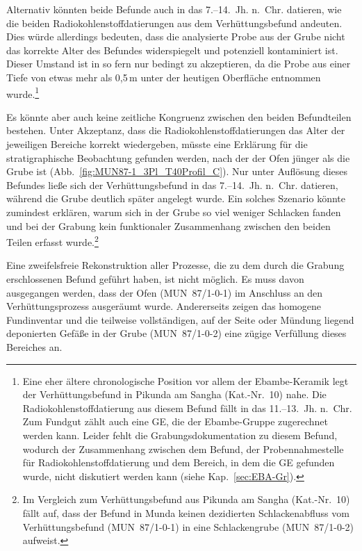 Alternativ könnten beide Befunde auch in das 7.--14.~Jh. n.~Chr. datieren, wie die beiden Radiokohlenstoffdatierungen aus dem Verhüttungsbefund andeuten. Dies würde allerdings bedeuten, dass die analysierte Probe aus der Grube nicht das korrekte Alter des Befundes widerspiegelt und potenziell kontaminiert ist. Dieser Umstand ist in so fern nur bedingt zu akzeptieren, da die Probe aus einer Tiefe von etwas mehr als 0,5\,m unter der heutigen Oberfläche entnommen wurde.\footnote{Eine eher ältere chronologische Position vor allem der Ebambe-Keramik legt der Verhüttungsbefund in Pikunda am \mbox{Sangha} (Kat.-Nr.~10) nahe. Die Radiokohlenstoffdatierung aus diesem Befund fällt in das 11.--13.~Jh. n.~Chr. Zum Fundgut zählt auch eine GE, die der Ebambe-Gruppe zugerechnet werden kann. Leider fehlt die Grabungsdokumentation zu diesem Befund, wodurch der Zusammenhang zwischen dem Befund, der Probennahmestelle für Radiokohlenstoffdatierung und dem Bereich, in dem die GE gefunden wurde, nicht diskutiert werden kann (siehe Kap.~\ref{sec:EBA-Gr}).}

Es könnte aber auch keine zeitliche Kongruenz zwischen den beiden Befundteilen bestehen. Unter Akzeptanz, dass die Radiokohlenstoffdatierungen das Alter der jeweiligen Bereiche korrekt wiedergeben, müsste eine Erklärung für die stratigraphische Beobachtung gefunden werden, nach der der Ofen jünger als die Grube ist (Abb.~\ref{fig:MUN87-1_3Pl_T40Profil_C}). Nur unter Auflösung dieses Befundes ließe sich der Verhüttungsbefund in das 7.--14.~Jh. n.~Chr. datieren, während die Grube deutlich später angelegt wurde. Ein solches Szenario könnte zumindest erklären, warum sich in der Grube so viel weniger Schlacken fanden und bei der Grabung kein funktionaler Zusammenhang zwischen den beiden Teilen erfasst wurde.\footnote{Im Vergleich zum Verhüttungsbefund aus Pikunda am \mbox{Sangha} (Kat.-Nr.~10) fällt auf, dass der Befund in Munda keinen dezidierten Schlackenabfluss vom Verhüttungsbefund (MUN~87/1-0-1) in eine Schlackengrube (MUN~87/1-0-2) aufweist.}

Eine zweifelsfreie Rekonstruktion aller Prozesse, die zu dem durch die Grabung erschlossenen Befund geführt haben, ist nicht möglich. Es muss davon ausgegangen werden, dass der Ofen (\mbox{MUN~87/1-0-1}) im Anschluss an den Verhüttungsprozess ausgeräumt wurde. Andererseits zeigen das homogene Fundinventar und die teilweise vollständigen, auf der Seite oder Mündung liegend deponierten Gefäße in der Grube (\mbox{MUN~87/1-0-2}) eine zügige Verfüllung dieses Bereiches an.